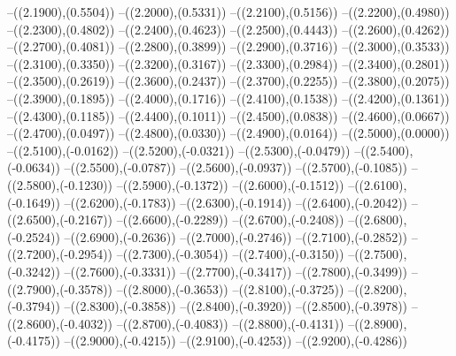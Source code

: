 {	--({\sx*(2.1900)},{\sy*(0.5504)})
	--({\sx*(2.2000)},{\sy*(0.5331)})
	--({\sx*(2.2100)},{\sy*(0.5156)})
	--({\sx*(2.2200)},{\sy*(0.4980)})
	--({\sx*(2.2300)},{\sy*(0.4802)})
	--({\sx*(2.2400)},{\sy*(0.4623)})
	--({\sx*(2.2500)},{\sy*(0.4443)})
	--({\sx*(2.2600)},{\sy*(0.4262)})
	--({\sx*(2.2700)},{\sy*(0.4081)})
	--({\sx*(2.2800)},{\sy*(0.3899)})
	--({\sx*(2.2900)},{\sy*(0.3716)})
	--({\sx*(2.3000)},{\sy*(0.3533)})
	--({\sx*(2.3100)},{\sy*(0.3350)})
	--({\sx*(2.3200)},{\sy*(0.3167)})
	--({\sx*(2.3300)},{\sy*(0.2984)})
	--({\sx*(2.3400)},{\sy*(0.2801)})
	--({\sx*(2.3500)},{\sy*(0.2619)})
	--({\sx*(2.3600)},{\sy*(0.2437)})
	--({\sx*(2.3700)},{\sy*(0.2255)})
	--({\sx*(2.3800)},{\sy*(0.2075)})
	--({\sx*(2.3900)},{\sy*(0.1895)})
	--({\sx*(2.4000)},{\sy*(0.1716)})
	--({\sx*(2.4100)},{\sy*(0.1538)})
	--({\sx*(2.4200)},{\sy*(0.1361)})
	--({\sx*(2.4300)},{\sy*(0.1185)})
	--({\sx*(2.4400)},{\sy*(0.1011)})
	--({\sx*(2.4500)},{\sy*(0.0838)})
	--({\sx*(2.4600)},{\sy*(0.0667)})
	--({\sx*(2.4700)},{\sy*(0.0497)})
	--({\sx*(2.4800)},{\sy*(0.0330)})
	--({\sx*(2.4900)},{\sy*(0.0164)})
	--({\sx*(2.5000)},{\sy*(0.0000)})
	--({\sx*(2.5100)},{\sy*(-0.0162)})
	--({\sx*(2.5200)},{\sy*(-0.0321)})
	--({\sx*(2.5300)},{\sy*(-0.0479)})
	--({\sx*(2.5400)},{\sy*(-0.0634)})
	--({\sx*(2.5500)},{\sy*(-0.0787)})
	--({\sx*(2.5600)},{\sy*(-0.0937)})
	--({\sx*(2.5700)},{\sy*(-0.1085)})
	--({\sx*(2.5800)},{\sy*(-0.1230)})
	--({\sx*(2.5900)},{\sy*(-0.1372)})
	--({\sx*(2.6000)},{\sy*(-0.1512)})
	--({\sx*(2.6100)},{\sy*(-0.1649)})
	--({\sx*(2.6200)},{\sy*(-0.1783)})
	--({\sx*(2.6300)},{\sy*(-0.1914)})
	--({\sx*(2.6400)},{\sy*(-0.2042)})
	--({\sx*(2.6500)},{\sy*(-0.2167)})
	--({\sx*(2.6600)},{\sy*(-0.2289)})
	--({\sx*(2.6700)},{\sy*(-0.2408)})
	--({\sx*(2.6800)},{\sy*(-0.2524)})
	--({\sx*(2.6900)},{\sy*(-0.2636)})
	--({\sx*(2.7000)},{\sy*(-0.2746)})
	--({\sx*(2.7100)},{\sy*(-0.2852)})
	--({\sx*(2.7200)},{\sy*(-0.2954)})
	--({\sx*(2.7300)},{\sy*(-0.3054)})
	--({\sx*(2.7400)},{\sy*(-0.3150)})
	--({\sx*(2.7500)},{\sy*(-0.3242)})
	--({\sx*(2.7600)},{\sy*(-0.3331)})
	--({\sx*(2.7700)},{\sy*(-0.3417)})
	--({\sx*(2.7800)},{\sy*(-0.3499)})
	--({\sx*(2.7900)},{\sy*(-0.3578)})
	--({\sx*(2.8000)},{\sy*(-0.3653)})
	--({\sx*(2.8100)},{\sy*(-0.3725)})
	--({\sx*(2.8200)},{\sy*(-0.3794)})
	--({\sx*(2.8300)},{\sy*(-0.3858)})
	--({\sx*(2.8400)},{\sy*(-0.3920)})
	--({\sx*(2.8500)},{\sy*(-0.3978)})
	--({\sx*(2.8600)},{\sy*(-0.4032)})
	--({\sx*(2.8700)},{\sy*(-0.4083)})
	--({\sx*(2.8800)},{\sy*(-0.4131)})
	--({\sx*(2.8900)},{\sy*(-0.4175)})
	--({\sx*(2.9000)},{\sy*(-0.4215)})
	--({\sx*(2.9100)},{\sy*(-0.4253)})
	--({\sx*(2.9200)},{\sy*(-0.4286)})
}
